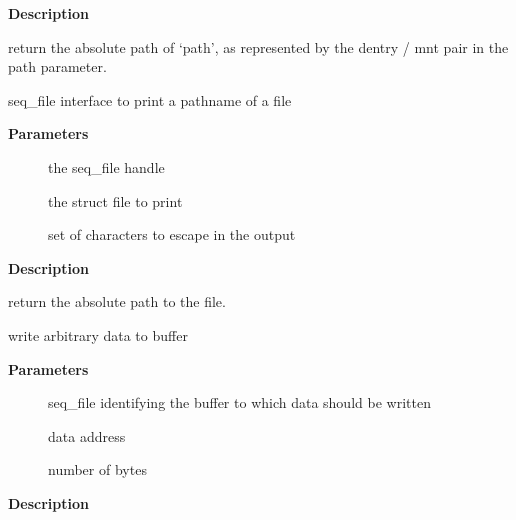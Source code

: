 \documentclass[a4paper,8pt,english]{sphinxmanual}
\begin{document}
\textbf{Description}

return the absolute path of `path', as represented by the
dentry / mnt pair in the path parameter.

\begin{fulllineitems}
\label{filesystems/index:c.seq_file_path}
seq\_file interface to print a pathname of a file

\end{fulllineitems}


\textbf{Parameters}
\begin{description}
\item[{}] \leavevmode
the seq\_file handle

\item[{}] \leavevmode
the struct file to print

\item[{}] \leavevmode
set of characters to escape in the output

\end{description}

\textbf{Description}

return the absolute path to the file.

\begin{fulllineitems}
\label{filesystems/index:c.seq_write}
write arbitrary data to buffer

\end{fulllineitems}


\textbf{Parameters}
\begin{description}
\item[{}] \leavevmode
seq\_file identifying the buffer to which data should be written

\item[{}] \leavevmode
data address

\item[{}] \leavevmode
number of bytes

\end{description}

\textbf{Description}
\end{document}
